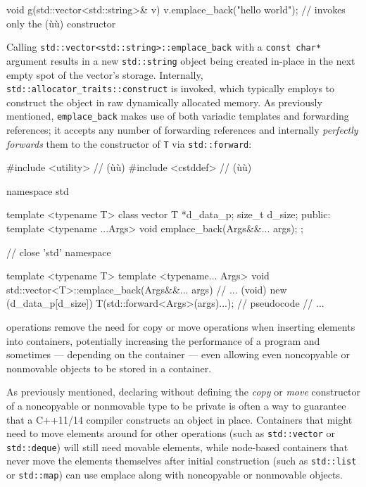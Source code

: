 \begin{emcppslisting}[emcppsbatch=e11]
void g(std::vector<std::string>& v)
{
    v.emplace_back("hello world");
        // invokes only the (ù{}ù) constructor
}
\end{emcppslisting}

\noindent Calling \lstinline!std::vector<std::string>::emplace_back! with a
\lstinline!const!~\lstinline!char*! argument results in a new
\lstinline!std::string! object being created in-place in the next empty
spot of the vector's storage. Internally,
\lstinline!std::allocator_traits::construct! is invoked, which typically
employs  to construct the object in raw
dynamically allocated memory. As previously mentioned,
\lstinline!emplace_back! makes use of both variadic
templates and forwarding references; it accepts any
number of forwarding references and internally \textit{perfectly forwards} them
to the constructor of \lstinline!T! via \lstinline!std::forward!:

\begin{emcppshiddenlisting}[emcppsbatch=e12]
#include <utility>  // (ù{}ù)
#include <cstddef>  // (ù{}ù)

namespace std {

template <typename T>
class vector
{
    T      *d_data_p;
    size_t  d_size;
public:
    template <typename ...Args>
    void emplace_back(Args&&... args);
};

} // close 'std' namespace
\end{emcppshiddenlisting}
\begin{emcppslisting}[emcppsbatch=e12]
template <typename T>
template <typename... Args>
void std::vector<T>::emplace_back(Args&&... args)
{
    // ...
    (void) new (d_data_p[d_size]) T(std::forward<Args>(args)...);  // pseudocode
    // ...
}
\end{emcppslisting}

\noindent {} operations remove the need for copy or move
operations when inserting elements into containers, potentially
increasing the performance of a program and sometimes --- depending on the
container --- even allowing even noncopyable or nonmovable objects to be stored
in a container.

As previously mentioned,
declaring without defining the \emph{copy} or \emph{move} constructor of a
noncopyable or nonmovable type to be private is often a way to guarantee that
a C++11/14 compiler constructs an object in place.
Containers that might need to move elements around for other operations
(such as \lstinline!std::vector! or \lstinline!std::deque!) will still need
movable elements, while node-based containers that never move the
elements themselves after initial construction (such as
\lstinline!std::list! or \lstinline!std::map!) can use emplace along with
noncopyable or nonmovable objects.

